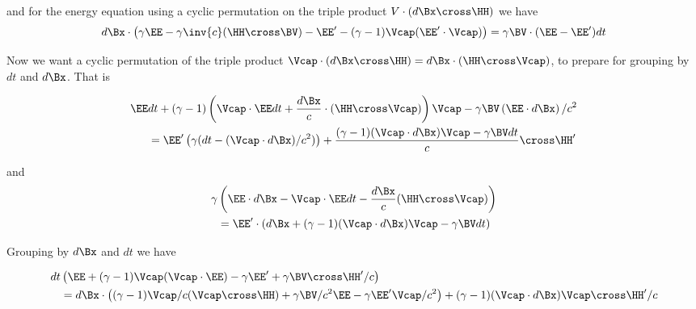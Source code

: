 and for the energy equation using a cyclic permutation on the triple product \(V \cdot (d\Bx \cross \HH)\) we have
\begin{equation}\label{eqn:lorentz_force_tx_2:140}
\begin{aligned}
d\Bx \cdot \left( \gamma \EE 
- \gamma \inv{c} (\HH \cross \BV)
-\EE' - (\gamma-1) \Vcap (\EE' \cdot \Vcap)
\right)
= \gamma \BV \cdot (\EE -\EE')dt 
\end{aligned}
\end{equation}

Now we want a cyclic permutation of the triple product \(\Vcap \cdot (d\Bx \cross \HH) = d\Bx \cdot (\HH \cross \Vcap)\), to prepare for grouping by \(dt\) and \(d\Bx\).  That is

\begin{equation}\label{eqn:lorentz_force_tx_2:160}
\begin{aligned}
\EE &dt 
+ (\gamma-1)\left(
\Vcap \cdot \EE dt 
+\frac{d\Bx}{c} \cdot (\HH \cross \Vcap)
\right) \Vcap - \gamma \BV \left( \EE \cdot d\Bx \right)/c^2  \\
&=
\EE' \left(\gamma ( dt - (\Vcap \cdot d\Bx )/c^2 )\right) + \frac{(\gamma-1)(\Vcap \cdot d\Bx) \Vcap - \gamma \BV dt}{c} \cross \HH' 
\end{aligned}
\end{equation}

and
\begin{equation}\label{eqn:lorentz_force_tx_2:180}
\begin{aligned}
\gamma &\left( \EE \cdot d\Bx - 
\Vcap \cdot \EE dt 
-\frac{d\Bx}{c} (\HH \cross \Vcap)
\right) \\
&=
\EE' \cdot \left(d\Bx + (\gamma-1)(\Vcap \cdot d\Bx) \Vcap - \gamma \BV dt\right)
\end{aligned}
\end{equation}

Grouping by \(d\Bx\) and \(dt\) we have

\begin{equation}\label{eqn:lorentz_force_tx_2:200}
\begin{aligned}
dt &\left(
\EE 
+ (\gamma-1) \Vcap (\Vcap \cdot \EE)
- \gamma \EE' 
+ \gamma \BV \cross \HH'/c 
\right)
\\
&=
d\Bx \cdot \left(
(\gamma-1) \Vcap/c (\Vcap \cross \HH)
+ \gamma \BV/c^2 \EE 
- \gamma \EE' \Vcap/c^2 
\right)
+ (\gamma-1)(\Vcap \cdot d\Bx) \Vcap \cross \HH'/c
\end{aligned}
\end{equation}


